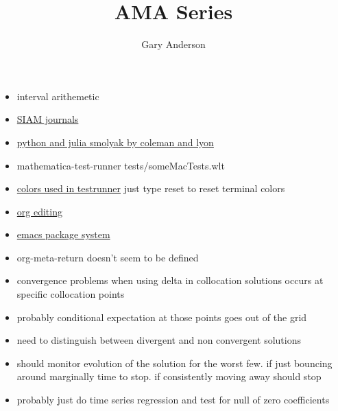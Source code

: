 \documentclass[hyperref]{labbook}
\begin{document}
\frontmatter
\title{AMA Series}
\author{Gary Anderson }
\maketitle

\printindex
\tableofcontents




\mainmatter


\begin{itemize}
\item interval arithemetic
\end{itemize}


\begin{itemize}
\item \href{https://www.siam.org/Publications/Journals}{SIAM journals}
\item \href{https://github.com/EconForge/Smolyak}{python and julia smolyak by coleman and lyon}
\end{itemize}







\begin{itemize}
\item mathematica-test-runner tests/someMacTests.wlt
\item \href{https://mathematica.stackexchange.com/questions/164468/wolframscript-how-to-print-in-color/164487#164487}{colors used in testrunner}  just type reset to reset terminal colors   
\end{itemize}


\begin{itemize}
\item \href{https://orgmode.org/manual/Structure-editing.html}{org editing}
\item \href{http://ergoemacs.org/emacs/emacs_package_system.html}{emacs package system}
\item org-meta-return doesn't seem to be defined
\end{itemize}




\begin{itemize}
\item convergence problems when using delta in collocation solutions occurs at specific collocation points
\item probably conditional expectation at those points goes out of the grid
\item need to distinguish between divergent and non convergent solutions
\item should monitor evolution of the solution for the worst few.  if just bouncing around marginally time to stop.  if consistently moving away should stop
\item probably just do time series regression and test for null of zero coefficients
\end{itemize}
\end{document}
